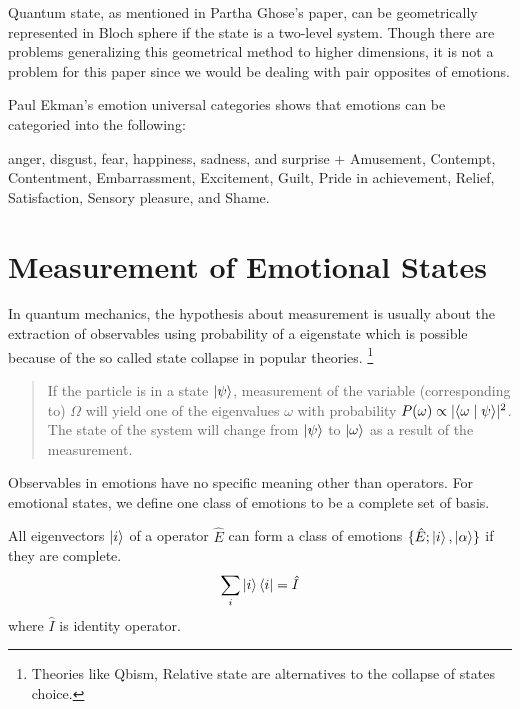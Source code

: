 \documentclass[%
 aip,
 jmp,%
 amsmath,amssymb,
 reprint,%
]{revtex4-1}
\begin{document}
Quantum state, as mentioned in Partha Ghose's paper\cite{hilbertEmotions}, can be geometrically represented in Bloch sphere if the state is a two-level system.\cite{bloch,nielsen} Though there are problems generalizing this geometrical method to higher dimensions, it is not a problem for this paper since we would be dealing with pair opposites of emotions.


Paul Ekman's emotion universal categories \cite{citNeeded} shows that emotions can be categoried into the following:

anger, disgust, fear, happiness, sadness, and surprise + Amusement, Contempt, Contentment, Embarrassment, Excitement, Guilt, Pride in achievement, Relief, Satisfaction, Sensory pleasure, and Shame.








\section{Measurement of Emotional States}

In quantum mechanics, the hypothesis about measurement is usually about the extraction of observables using probability of a eigenstate which is possible because of the so called state collapse in popular theories. \footnote{Theories like Qbism, Relative state are alternatives to the collapse of states choice.}

\begin{quote}
If the particle is in a state $\left| \psi\right\rangle$, measurement of the variable (corresponding to) $\Omega$ will yield one of the eigenvalues $\omega$ with probability $P(\omega)\propto |\langle \omega \mid \psi \rangle|^2$. The state of the system will change from $\left| \psi\right\rangle$ to $\left| \omega\right\rangle$ as a result of the measurement.\cite{shankar}
\end{quote}

Observables in emotions have no specific meaning other than operators. For emotional states, we define one class of emotions to be a complete set of basis.

\begin{define}
All eigenvectors $\left| i\right\rangle$ of a operator $\hat E$ can form a class of emotions $\{\hat E; \left| i\right\rangle,\left| \alpha\right\rangle \}$ if they are complete.
\begin{equation}
\sum_i \left| i\right\rangle\left\langle i\right| = \hat I
\end{equation}
where $\hat I$ is identity operator.
\end{define}
\end{document}

